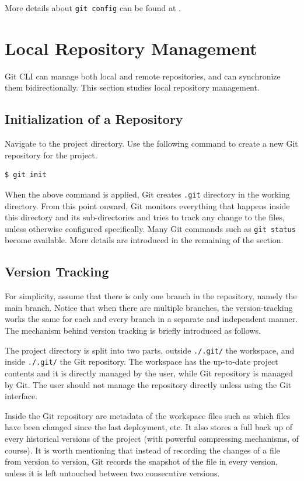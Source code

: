More details about \verb|git config| can be found at \cite{git2025reference}.

\section{Local Repository Management}

Git CLI can manage both local and remote repositories, and can synchronize them bidirectionally. This section studies local repository management.

\subsection{Initialization of a Repository}

Navigate to the project directory. Use the following command to create a new Git repository for the project.
\begin{lstlisting}
$ git init
\end{lstlisting}
When the above command is applied, Git creates \verb|.git| directory in the working directory. From this point onward, Git monitors everything that happens inside this directory and its sub-directories and tries to track any change to the files, unless otherwise configured specifically. Many Git commands such as \verb|git status| become available. More details are introduced in the remaining of the section.

\subsection{Version Tracking}

For simplicity, assume that there is only one branch in the repository, namely the main branch. Notice that when there are multiple branches, the version-tracking works the same for each and every branch in a separate and independent manner. The mechanism behind version tracking is briefly introduced as follows.

The project directory is split into two parts, outside \verb|./.git/| the workspace, and inside \verb|./.git/| the Git repository. The workspace has the up-to-date project contents and it is directly managed by the user, while Git repository is managed by Git. The user should not manage the repository directly unless using the Git interface.

Inside the Git repository are metadata of the workspace files such as which files have been changed since the last deployment, etc. It also stores a full back up of every historical versions of the project (with powerful compressing mechanisms, of course). It is worth mentioning that instead of recording the changes of a file from version to version, Git records the snapshot of the file in every version, unless it is left untouched between two consecutive versions.


